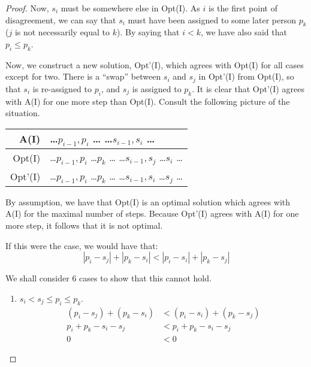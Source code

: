 \documentclass{article}
\begin{document}
\begin{enumerate}[label=(\alph*)]
\begin{proof}
            Now, $s_i$ must be somewhere else in Opt(I).
            As $i$ is the first point of disagreement, we can say that $s_i$ must have been assigned to some later person $p_k$ ($j$ is not necessarily equal to $k$).
            By saying that $i < k$, we have also said that $p_i \leq p_k$.

            Now, we construct a new solution, Opt'(I), which agrees with Opt(I) for all cases except for two.
            There is a ``swap'' between $s_i$ and $s_j$ in Opt'(I) from Opt(I), so that $s_i$ is re-assigned to $p_i$, and $s_j$ is assigned to $p_k$.
            It is clear that Opt'(I) agrees with A(I) for one more step than Opt(I).
            Consult the following picture of the situation.

            \begin{center}
            \begin{tabular}{r | p{}}
                A(I) & \ldots $p_{i-1}, p_i$ \ldots \newline
                    \ldots $s_{i-1}, s_i$ \ldots\\
                \hline
                Opt(I) & \ldots $p_{i-1}, p_i$ \ldots $p_k$ \ldots \newline
                \ldots $s_{i-1}, s_j$ \ldots $s_i$ \ldots \\
                \hline
                Opt'(I) & \ldots $p_{i-1}, p_i$ \ldots $p_k$ \ldots \newline
                \ldots $s_{i-1}, s_i$ \ldots $s_j$ \ldots \\
            \end{tabular}
            \end{center}

            By assumption, we have that Opt(I) is an optimal solution which agrees with A(I) for the maximal number of steps.
            Because Opt'(I) agrees with A(I) for one more step, it follows that it is not optimal.

            If this were the case, we would have that:
            $$ |p_i - s_j| + |p_k - s_i| < |p_i - s_i| + |p_k - s_j| $$

            We shall consider 6 cases to show that this cannot hold.
            \begin{enumerate}[label=Case \arabic*.]
                \item $ s_i < s_j \leq p_i \leq p_k $.
                \begin{align*}
                    (p_i - s_j) + (p_k - s_i) &< (p_i - s_i) + (p_k - s_j)\\
                    p_i + p_k - s_i - s_j &< p_i + p_k - s_i - s_j\\
                    0 &< 0
                \end{align*}


\end{enumerate}
\end{proof}
\end{enumerate}
\end{document}

